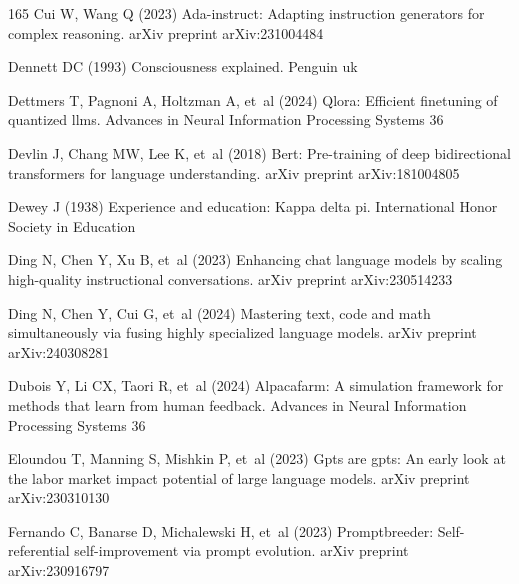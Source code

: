 \documentclass[sn-basic, Numbered]{sn-jnl}%
\theoremstyle{thmstyleone}%
\theoremstyle{thmstyletwo}%
\theoremstyle{thmstylethree}%
\begin{document}
\begin{thebibliography}{165}
Cui W, Wang Q (2023) Ada-instruct: Adapting instruction generators for complex reasoning. arXiv preprint arXiv:231004484

Dennett DC (1993) Consciousness explained. Penguin uk

Dettmers T, Pagnoni A, Holtzman A, et~al (2024) Qlora: Efficient finetuning of quantized llms. Advances in Neural Information Processing Systems 36

Devlin J, Chang MW, Lee K, et~al (2018) Bert: Pre-training of deep bidirectional transformers for language understanding. arXiv preprint arXiv:181004805

Dewey J (1938) Experience and education: Kappa delta pi. International Honor Society in Education

Ding N, Chen Y, Xu B, et~al (2023) Enhancing chat language models by scaling high-quality instructional conversations. arXiv preprint arXiv:230514233

Ding N, Chen Y, Cui G, et~al (2024) Mastering text, code and math simultaneously via fusing highly specialized language models. arXiv preprint arXiv:240308281

Dubois Y, Li CX, Taori R, et~al (2024) Alpacafarm: A simulation framework for methods that learn from human feedback. Advances in Neural Information Processing Systems 36

Eloundou T, Manning S, Mishkin P, et~al (2023) Gpts are gpts: An early look at the labor market impact potential of large language models. arXiv preprint arXiv:230310130

Fernando C, Banarse D, Michalewski H, et~al (2023) Promptbreeder: Self-referential self-improvement via prompt evolution. arXiv preprint arXiv:230916797


\end{thebibliography}
\end{document}
